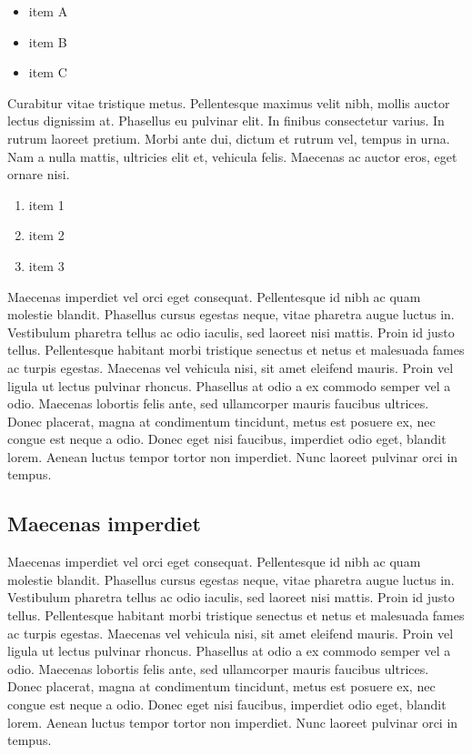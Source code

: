 \documentclass{article}
\begin{document}
\begin{itemize}
\item 
      item A
    

\item  item B
    

\item  item C

\end{itemize}

 Curabitur vitae tristique metus. Pellentesque maximus velit nibh, mollis auctor lectus dignissim at. Phasellus eu pulvinar elit. In finibus consectetur varius. In rutrum laoreet pretium. Morbi ante dui, dictum et rutrum vel, tempus in urna. Nam a nulla mattis, ultricies elit et, vehicula felis. Maecenas ac auctor eros, eget ornare nisi. 

\begin{enumerate}
\item 
      item 1
    

\item  item 2
    

\item  item 3

\end{enumerate}

 Maecenas imperdiet vel orci eget consequat. Pellentesque id nibh ac quam molestie blandit. Phasellus cursus egestas neque, vitae pharetra augue luctus in. Vestibulum pharetra tellus ac odio iaculis, sed laoreet nisi mattis. Proin id justo tellus. Pellentesque habitant morbi tristique senectus et netus et malesuada fames ac turpis egestas. Maecenas vel vehicula nisi, sit amet eleifend mauris. Proin vel ligula ut lectus pulvinar rhoncus. Phasellus at odio a ex commodo semper vel a odio. Maecenas lobortis felis ante, sed ullamcorper mauris faucibus ultrices. Donec placerat, magna at condimentum tincidunt, metus est posuere ex, nec congue est neque a odio. Donec eget nisi faucibus, imperdiet odio eget, blandit lorem. Aenean luctus tempor tortor non imperdiet. Nunc laoreet pulvinar orci in tempus. 

\subsection{ Maecenas imperdiet }

 Maecenas imperdiet vel orci eget consequat. Pellentesque id nibh ac quam molestie blandit. Phasellus cursus egestas neque, vitae pharetra augue luctus in. Vestibulum pharetra tellus ac odio iaculis, sed laoreet nisi mattis. Proin id justo tellus. Pellentesque habitant morbi tristique senectus et netus et malesuada fames ac turpis egestas. Maecenas vel vehicula nisi, sit amet eleifend mauris. Proin vel ligula ut lectus pulvinar rhoncus. Phasellus at odio a ex commodo semper vel a odio. Maecenas lobortis felis ante, sed ullamcorper mauris faucibus ultrices. Donec placerat, magna at condimentum tincidunt, metus est posuere ex, nec congue est neque a odio. Donec eget nisi faucibus, imperdiet odio eget, blandit lorem. Aenean luctus tempor tortor non imperdiet. Nunc laoreet pulvinar orci in tempus. 
\end{document}
